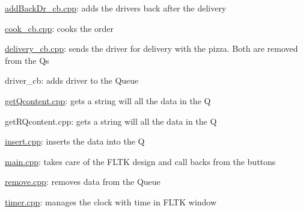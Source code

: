 \begin{DoxyItemize}
\item \hyperlink{addBackDr__cb_8cpp}{add\+Back\+Dr\+\_\+cb.\+cpp}\+: adds the drivers back after the delivery \item \hyperlink{cook__cb_8cpp}{cook\+\_\+cb.\+cpp}\+: cooks the order \item \hyperlink{delivery__cb_8cpp}{delivery\+\_\+cb.\+cpp}\+: sends the driver for delivery with the pizza. Both are removed from the Qs \item driver\+\_\+cb\+: adds driver to the Queue \item \hyperlink{getQcontent_8cpp}{get\+Qcontent.\+cpp}\+: gets a string will all the data in the Q \item get\+R\+Qcontent.\+cpp\+: gets a string will all the data in the Q \item \hyperlink{insert_8cpp}{insert.\+cpp}\+: inserts the data into the Q \item \hyperlink{main_8cpp}{main.\+cpp}\+: takes care of the F\+L\+T\+K design and call backs from the buttons \item \hyperlink{remove_8cpp}{remove.\+cpp}\+: removes data from the Queue \item \hyperlink{timer_8cpp}{timer.\+cpp}\+: manages the clock with time in F\+L\+T\+K window \end{DoxyItemize}
